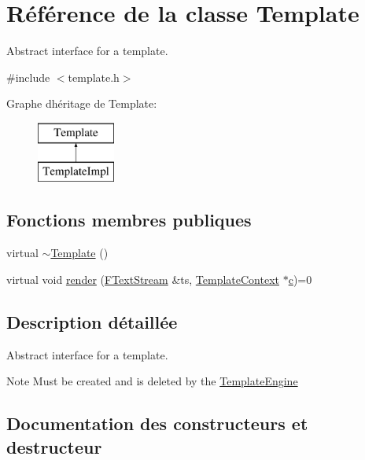 \hypertarget{class_template}{}\section{Référence de la classe Template}
\label{class_template}


Abstract interface for a template.  




{\ttfamily \#include $<$template.\+h$>$}

Graphe d\textquotesingle{}héritage de Template\+:\begin{figure}[H]
\begin{center}
\leavevmode
\includegraphics[height=2.000000cm]{class_template}
\end{center}
\end{figure}
\subsection*{Fonctions membres publiques}
\begin{DoxyCompactItemize}
\item 
virtual \hyperlink{class_template_a42de08b6f1a3e319f351d412ab721b25}{$\sim$\+Template} ()
\item 
virtual void \hyperlink{class_template_af9582cccc21e9aea39bd3fdbc609b03c}{render} (\hyperlink{class_f_text_stream}{F\+Text\+Stream} \&ts, \hyperlink{class_template_context}{Template\+Context} $\ast$\hyperlink{060__command__switch_8tcl_ab14f56bc3bd7680490ece4ad7815465f}{c})=0
\end{DoxyCompactItemize}


\subsection{Description détaillée}
Abstract interface for a template. 

\begin{DoxyNote}{Note}
Must be created and is deleted by the \hyperlink{class_template_engine}{Template\+Engine} 
\end{DoxyNote}


\subsection{Documentation des constructeurs et destructeur}
\hypertarget{class_template_a42de08b6f1a3e319f351d412ab721b25}{}
